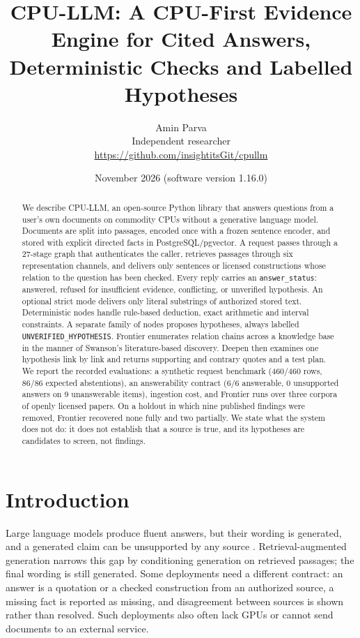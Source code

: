 \documentclass[11pt]{article}
\title{CPU-LLM: A CPU-First Evidence Engine for Cited Answers,\\Deterministic Checks and Labelled Hypotheses}
\author{Amin Parva\\\small Independent researcher\\\small\url{https://github.com/insightitsGit/cpullm}}
\date{November 2026 \quad (software version 1.16.0)}
\begin{document}
\maketitle

\begin{abstract}
We describe CPU-LLM, an open-source Python library that answers questions from a user's own documents on
commodity CPUs without a generative language model. Documents are split into passages, encoded once with a frozen
sentence encoder, and stored with explicit directed facts in PostgreSQL/pgvector. A request passes through a
27-stage graph that authenticates the caller, retrieves passages through six representation channels, and
delivers only sentences or licensed constructions whose relation to the question has been checked. Every reply
carries an \texttt{answer\_status}: answered, refused for insufficient evidence, conflicting, or
unverified hypothesis. An optional strict mode delivers only literal substrings of authorized stored text.
Deterministic nodes handle rule-based deduction, exact arithmetic and interval constraints. A separate family of
nodes proposes hypotheses, always labelled \texttt{UNVERIFIED\_HYPOTHESIS}. Frontier enumerates relation chains
across a knowledge base in the manner of Swanson's literature-based discovery. Deepen then examines one hypothesis
link by link and returns supporting and contrary quotes and a test plan. We report the recorded evaluations:
a synthetic request benchmark (460/460 rows, 86/86 expected abstentions), an answerability contract (6/6
answerable, 0 unsupported answers on 9 unanswerable items), ingestion cost, and Frontier runs over three corpora
of openly licensed papers. On a holdout in which nine published findings were removed, Frontier recovered none
fully and two partially. We state what the system does not do: it does not establish that a source is true, and
its hypotheses are candidates to screen, not findings.
\end{abstract}

\section{Introduction}

Large language models produce fluent answers, but their wording is generated, and a generated claim can be
unsupported by any source \cite{ji2023hallucination}. Retrieval-augmented generation \cite{lewis2020rag} narrows
this gap by conditioning generation on retrieved passages; the final wording is still generated. Some
deployments need a different contract: an answer is a quotation or a checked construction from an authorized
source, a missing fact is reported as missing, and disagreement between sources is shown rather than resolved.
Such deployments also often lack GPUs or cannot send documents to an external service.
\end{document}
